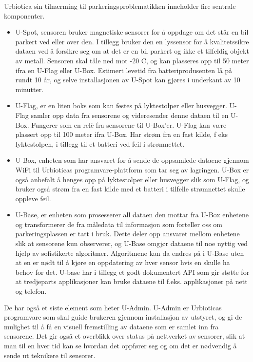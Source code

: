 \documentclass[a4paper, norsk, 12pt]{article}
\theoremstyle{remark}
\begin{document}
Urbiotica sin tilnærming til parkeringsproblematikken inneholder fire sentrale komponenter. 
\begin{itemize}
	\item U-Spot, sensoren bruker magnetiske sensorer for å oppdage om det står en bil parkert ved eller over den. I tillegg bruker den en lyssensor for å kvalitetssikre dataen ved å forsikre seg om at det er en bil parkert og ikke et tilfeldig objekt av metall. Sensoren skal tåle ned mot -20 C, og kan plasseres opp til 50 meter ifra en U-Flag eller U-Box. Estimert levetid fra batteriprodusenten lå på rundt 10 år, og selve installasjonen av U-Spot kan gjøres i underkant av 10 minutter.   
	\item U-Flag, er en liten boks som kan festes på lyktestolper eller husvegger. U-Flag samler opp data fra sensorene og videresender denne dataen til en U-Box. Fungerer som en relè fra sensorene til U-Box’er. U-Flag kan være plassert opp til 100 meter ifra U-Box. Har strøm fra en fast kilde, f eks lyktestolpen, i tillegg til et batteri ved feil i strømnettet. 
 \item U-Box, enheten som har ansvaret for å sende de oppsamlede dataene gjennom WiFi til Urbioticas programvare-plattform som tar seg av lagringen. U-Box er også anbefalt å henges opp på lyktestolper eller husvegger slik som U-Flag, og bruker også strøm fra en fast kilde med et batteri i tilfelle strømnettet skulle oppleve feil. 
	\item U-Base, er enheten som prosesserer all dataen den mottar fra U-Box enhetene og transformerer de fra måledata til informasjon som forteller oss om parkeringsplassen er tatt i bruk. Dette deler opp ansvaret mellom enhetene slik at sensorene kun observerer, og U-Base omgjør dataene til noe nyttig ved hjelp av sofistikerte algoritmer. Algoritmene kan da endres på i U-Base uten at en er nødt til å kjøre en oppdatering av hver sensor hvis en skulle ha behov for det. U-base har i tillegg et godt dokumentert API som gir støtte for at tredjeparts applikasjoner kan bruke dataene til f.eks. applikasjoner på nett og telefon. 
\end{itemize}

De har også et siste element som heter U-Admin. U-Admin er Urbioticas programvare som skal guide brukeren gjennom installasjon av utstyret, og gi de mulighet til å få en visuell fremstilling av dataene som er samlet inn fra sensorene. Det gir også et overblikk over status på nettverket av sensorer, slik at man til en hver tid kan se hvordan det oppfører seg og om det er nødvendig å sende ut teknikere til sensorer. 
\end{document}
